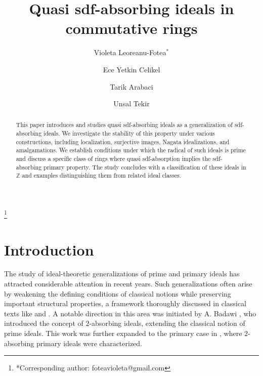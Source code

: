 \documentclass{amsart}%
\begin{document}
\title[Quasi-sdf-absorbing ideals]{Quasi sdf-absorbing ideals in commutative rings}
\date{}
\author{Violeta Leoreanu-Fotea$^{*} $}
\address{Faculty of Mathematics, Al.I. Cuza University, Bd. Carol I, No. 11, 700506
Ia\c{s}i, Romania.}
\author{Ece Yetkin Celikel}
\address{Department of Software Engineering, Hasan Kalyoncu University, Gaziantep, T\"{u}rkiye}
\author{Tarik Arabaci}
\address{Department of Basic Science, Faculty of Engineering and Architecture, Istanbul
Geli\c{s}im University, Istanbul, T\"{u}rkiye}
\author{Unsal Tekir}
\address{Department of Mathematics, Marmara University, Istanbul, T\"urkiye}
\thanks{*Corresponding author: foteavioleta@gmail.com}

\begin{abstract}
This paper introduces and studies quasi sdf-absorbing ideals as a
generalization of sdf-absorbing ideals. We investigate the stability of this
property under various constructions, including localization, surjective
images, Nagata idealizations, and amalgamations. We establish conditions under
which the radical of such ideals is prime and discuss a specific class of
rings where quasi sdf-absorption implies the sdf-absorbing primary property.
The study concludes with a classification of these ideals in $\mathbb{Z}$ and
examples distinguishing them from related ideal classes.

\end{abstract}
\maketitle


\section{Introduction}

The study of ideal-theoretic generalizations of prime and primary ideals has
attracted considerable attention in recent years. Such generalizations often
arise by weakening the defining conditions of classical notions while
preserving important structural properties, a framework thoroughly discussed
in classical texts like \cite{AM1969} and \cite{Lang}. A notable direction in
this area was initiated by A. Badawi \cite{B2007}, who introduced the concept
of $2$-absorbing ideals, extending the classical notion of prime ideals. This
work was further expanded to the primary case in \cite{BTY}, where
$2$-absorbing primary ideals were characterized.
\end{document}
